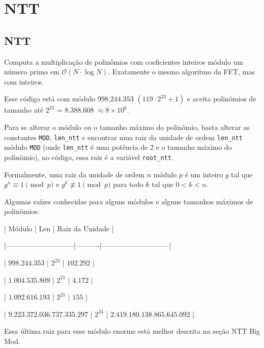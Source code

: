\documentclass[10pt, a4paper, oneside]{book}
\begin{document}
\section{NTT}
\subsection{NTT}


Computa a multiplicação de polinômios com coeficientes inteiros módulo um número primo em $\mathcal{O}(N \cdot \log N)$. Exatamente o mesmo algoritmo da FFT, mas com inteiros.



Esse código está com módulo $998.244.353$ $(119 \cdot 2^{23} + 1)$ e aceita polinômios de tamanho até $2^{23}$ = $8.388.608$ $\approx 8 \times 10^6$.



Para se alterar o módulo ou o tamanho máximo do polinômio, basta alterar as constantes \texttt{MOD}, \texttt{len\_ntt} e encontrar uma raiz da unidade de ordem \texttt{len\_ntt} módulo \texttt{MOD} (onde \texttt{len\_ntt} é uma potência de 2 e o tamanho máximo do polinômio), no código, essa raiz é a variável \texttt{root\_ntt}.



Formalmente, uma raiz da unidade de ordem $n$ módulo $p$ é um inteiro $g$ tal que $g^n \equiv 1 \pmod{p}$ e $g^k \not\equiv 1 \pmod{p}$ para todo $k$ tal que $0 < k < n$.



Algumas raízes conhecidas para alguns módulos e alguns tamanhos máximos de polinômios:



|           Módulo            |   Len    |       Raiz da Unidade       |

|-----------------------------|----------|-----------------------------|

|        $998.244.353$        | $2^{23}$ |          $102.292$          |

|       $1.004.535.809$       | $2^{21}$ |           $4.172$           |

|       $1.092.616.193$       | $2^{21}$ |            $155$            |

| $9.223.372.036.737.335.297$ | $2^{24}$ | $2.419.180.138.865.645.092$ |



Essa última raiz para esse módulo enorme está melhor descrita na seção NTT Big Mod.
\end{document}
